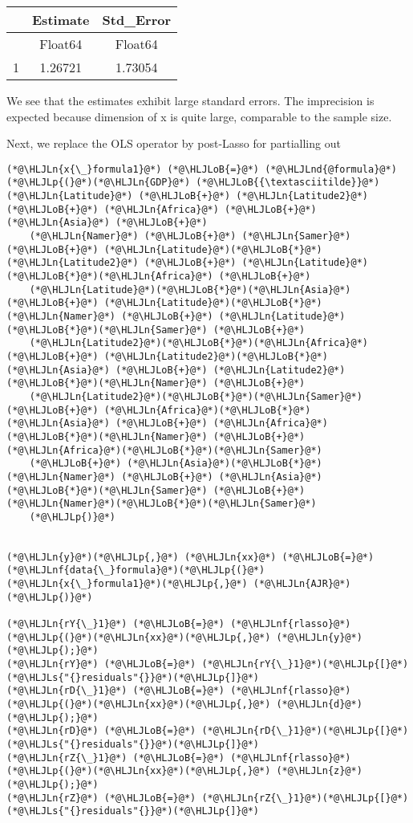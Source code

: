 \documentclass[12pt,a4paper]{article}
\newcommand{\HLJLn}[1]{#1}
\newcommand{\HLJLnd}[1]{\textcolor[RGB]{214,102,97}{#1}}
\newcommand{\HLJLnf}[1]{\textcolor[RGB]{66,102,213}{#1}}
\newcommand{\HLJLs}[1]{\textcolor[RGB]{201,61,57}{#1}}
\newcommand{\HLJLoB}[1]{\textcolor[RGB]{102,102,102}{\textbf{#1}}}
\newcommand{\HLJLp}[1]{#1}
\begin{document}
\begin{tabular}{r|cc}
	& Estimate & Std\_Error\\
	\hline
	& Float64 & Float64\\
	\hline
	1 & 1.26721 & 1.73054 \\
\end{tabular}


We see that the estimates exhibit large standard errors. The imprecision is expected because dimension of x is quite large, comparable to the sample size.

Next, we replace the OLS operator by post-Lasso for partialling out


\begin{lstlisting}
(*@\HLJLn{x{\_}formula1}@*) (*@\HLJLoB{=}@*) (*@\HLJLnd{@formula}@*)(*@\HLJLp{(}@*)(*@\HLJLn{GDP}@*) (*@\HLJLoB{{\textasciitilde}}@*) (*@\HLJLn{Latitude}@*) (*@\HLJLoB{+}@*) (*@\HLJLn{Latitude2}@*) (*@\HLJLoB{+}@*) (*@\HLJLn{Africa}@*) (*@\HLJLoB{+}@*) (*@\HLJLn{Asia}@*) (*@\HLJLoB{+}@*) 
    (*@\HLJLn{Namer}@*) (*@\HLJLoB{+}@*) (*@\HLJLn{Samer}@*) (*@\HLJLoB{+}@*) (*@\HLJLn{Latitude}@*)(*@\HLJLoB{*}@*)(*@\HLJLn{Latitude2}@*) (*@\HLJLoB{+}@*) (*@\HLJLn{Latitude}@*)(*@\HLJLoB{*}@*)(*@\HLJLn{Africa}@*) (*@\HLJLoB{+}@*) 
    (*@\HLJLn{Latitude}@*)(*@\HLJLoB{*}@*)(*@\HLJLn{Asia}@*) (*@\HLJLoB{+}@*) (*@\HLJLn{Latitude}@*)(*@\HLJLoB{*}@*)(*@\HLJLn{Namer}@*) (*@\HLJLoB{+}@*) (*@\HLJLn{Latitude}@*)(*@\HLJLoB{*}@*)(*@\HLJLn{Samer}@*) (*@\HLJLoB{+}@*) 
    (*@\HLJLn{Latitude2}@*)(*@\HLJLoB{*}@*)(*@\HLJLn{Africa}@*) (*@\HLJLoB{+}@*) (*@\HLJLn{Latitude2}@*)(*@\HLJLoB{*}@*)(*@\HLJLn{Asia}@*) (*@\HLJLoB{+}@*) (*@\HLJLn{Latitude2}@*)(*@\HLJLoB{*}@*)(*@\HLJLn{Namer}@*) (*@\HLJLoB{+}@*) 
    (*@\HLJLn{Latitude2}@*)(*@\HLJLoB{*}@*)(*@\HLJLn{Samer}@*) (*@\HLJLoB{+}@*) (*@\HLJLn{Africa}@*)(*@\HLJLoB{*}@*)(*@\HLJLn{Asia}@*) (*@\HLJLoB{+}@*) (*@\HLJLn{Africa}@*)(*@\HLJLoB{*}@*)(*@\HLJLn{Namer}@*) (*@\HLJLoB{+}@*) (*@\HLJLn{Africa}@*)(*@\HLJLoB{*}@*)(*@\HLJLn{Samer}@*)
    (*@\HLJLoB{+}@*) (*@\HLJLn{Asia}@*)(*@\HLJLoB{*}@*)(*@\HLJLn{Namer}@*) (*@\HLJLoB{+}@*) (*@\HLJLn{Asia}@*)(*@\HLJLoB{*}@*)(*@\HLJLn{Samer}@*) (*@\HLJLoB{+}@*) (*@\HLJLn{Namer}@*)(*@\HLJLoB{*}@*)(*@\HLJLn{Samer}@*)
    (*@\HLJLp{)}@*)


(*@\HLJLn{y}@*)(*@\HLJLp{,}@*) (*@\HLJLn{xx}@*) (*@\HLJLoB{=}@*) (*@\HLJLnf{data{\_}formula}@*)(*@\HLJLp{(}@*)(*@\HLJLn{x{\_}formula1}@*)(*@\HLJLp{,}@*) (*@\HLJLn{AJR}@*)(*@\HLJLp{)}@*)

(*@\HLJLn{rY{\_}1}@*) (*@\HLJLoB{=}@*) (*@\HLJLnf{rlasso}@*)(*@\HLJLp{(}@*)(*@\HLJLn{xx}@*)(*@\HLJLp{,}@*) (*@\HLJLn{y}@*)(*@\HLJLp{);}@*)
(*@\HLJLn{rY}@*) (*@\HLJLoB{=}@*) (*@\HLJLn{rY{\_}1}@*)(*@\HLJLp{[}@*)(*@\HLJLs{"{}residuals"{}}@*)(*@\HLJLp{]}@*)
(*@\HLJLn{rD{\_}1}@*) (*@\HLJLoB{=}@*) (*@\HLJLnf{rlasso}@*)(*@\HLJLp{(}@*)(*@\HLJLn{xx}@*)(*@\HLJLp{,}@*) (*@\HLJLn{d}@*)(*@\HLJLp{);}@*)
(*@\HLJLn{rD}@*) (*@\HLJLoB{=}@*) (*@\HLJLn{rD{\_}1}@*)(*@\HLJLp{[}@*)(*@\HLJLs{"{}residuals"{}}@*)(*@\HLJLp{]}@*)
(*@\HLJLn{rZ{\_}1}@*) (*@\HLJLoB{=}@*) (*@\HLJLnf{rlasso}@*)(*@\HLJLp{(}@*)(*@\HLJLn{xx}@*)(*@\HLJLp{,}@*) (*@\HLJLn{z}@*)(*@\HLJLp{);}@*)
(*@\HLJLn{rZ}@*) (*@\HLJLoB{=}@*) (*@\HLJLn{rZ{\_}1}@*)(*@\HLJLp{[}@*)(*@\HLJLs{"{}residuals"{}}@*)(*@\HLJLp{]}@*)


\end{lstlisting}
\end{document}
